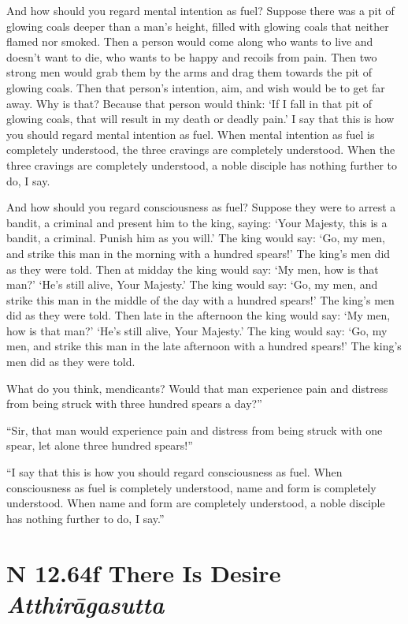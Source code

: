 \documentclass[12pt,openany]{book}%
\newcommand*{\suttatitleacronym}[1]{\smaller[2]{#1}\vspace*{.3em}}
\newcommand*{\suttatitletranslation}[1]{\linebreak{#1}}
\newcommand*{\suttatitleroot}[1]{\linebreak\smaller[2]\itshape{#1}}
\newcommand*{\tocacronym}[1]{\hspace*{-3.3em}{#1}\quad}
\newcommand*{\toctranslation}[1]{#1}
\newcommand*{\tocroot}[1]{(\textit{#1})}
\begin{document}
And how should you regard mental intention as fuel? Suppose there was a pit of glowing coals deeper than a man’s height, filled with glowing coals that neither flamed nor smoked. Then a person would come along who wants to live and doesn’t want to die, who wants to be happy and recoils from pain. Then two strong men would grab them by the arms and drag them towards the pit of glowing coals. Then that person’s intention, aim, and wish would be to get far away. Why is that? Because that person would think: ‘If I fall in that pit of glowing coals, that will result in my death or deadly pain.’ I say that this is how you should regard mental intention as fuel. When mental intention as fuel is completely understood, the three cravings are completely understood. When the three cravings are completely understood, a noble disciple has nothing further to do, I say. 

And how should you regard consciousness as fuel? Suppose they were to arrest a bandit, a criminal and present him to the king, saying: ‘Your Majesty, this is a bandit, a criminal. Punish him as you will.’ The king would say: ‘Go, my men, and strike this man in the morning with a hundred spears!’ The king’s men did as they were told. Then at midday the king would say: ‘My men, how is that man?’ ‘He’s still alive, Your Majesty.’ The king would say: ‘Go, my men, and strike this man in the middle of the day with a hundred spears!’ The king’s men did as they were told. Then late in the afternoon the king would say: ‘My men, how is that man?’ ‘He’s still alive, Your Majesty.’ The king would say: ‘Go, my men, and strike this man in the late afternoon with a hundred spears!’ The king’s men did as they were told. 

What do you think, mendicants? Would that man experience pain and distress from being struck with three hundred spears a day?” 

“Sir, that man would experience pain and distress from being struck with one spear, let alone three hundred spears!” 

“I say that this is how you should regard consciousness as fuel. When consciousness as fuel is completely understood, name and form is completely understood. When name and form are completely understood, a noble disciple has nothing further to do, I say.” 

%
\section*{{\suttatitleacronym SN 12.64}{\suttatitletranslation If There Is Desire }{\suttatitleroot Atthirāgasutta}}
\addcontentsline{toc}{section}{\tocacronym{SN 12.64} \toctranslation{If There Is Desire } \tocroot{Atthirāgasutta}}
\end{document}

